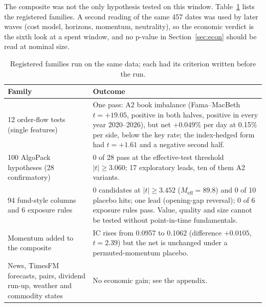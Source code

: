 \documentclass[11pt]{article}
\begin{document}
The composite was not the only hypothesis tested on this window. Table~\ref{tab:scan} lists the registered families. A second reading of the same 457 dates was used by later waves (cost model, horizons, momentum, neutrality), so the economic verdict is the sixth look at a spent window, and no p-value in Section~\ref{sec:econ} should be read at nominal size.

\begin{table}[ht]
\centering
\caption{Registered families run on the same data; each had its criterion written before the run.}
\label{tab:scan}
\begin{tabular}{p{4.6cm}p{8.8cm}}
\toprule
Family & Outcome \\
\midrule
12 order-flow tests (single features) & One pass: A2 book imbalance (Fama--MacBeth $t=+19.05$, positive in both halves, positive in every year 2020--2026), but net $+0.049\%$ per day at 0.15\% per side, below the key rate; the index-hedged form had $t=+1.61$ and a negative second half. \\
100 AlgoPack hypotheses (28 confirmatory) & 0 of 28 pass at the effective-test threshold $|t|\ge 3.060$; 17 exploratory leads, ten of them A2 variants. \\
94 fund-style columns and 6 exposure rules & 0 candidates at $|t|\ge 3.452$ ($M_{\mathrm{eff}}=89.8$) and 0 of 10 placebo hits; one lead (opening-gap reversal); 0 of 6 exposure rules pass. Value, quality and size cannot be tested without point-in-time fundamentals. \\
Momentum added to the composite & IC rises from 0.0957 to 0.1062 (difference $+0.0105$, $t=2.39$) but the net is unchanged under a permuted-momentum placebo. \\
News, TimesFM forecasts, pairs, dividend run-up, weather and commodity states & No economic gain; see the appendix. \\
\bottomrule
\end{tabular}
\end{table}
\end{document}
